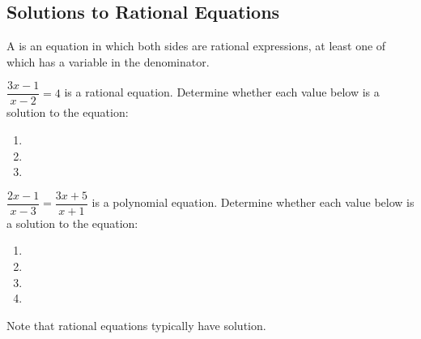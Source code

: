 \subsection{Solutions to Rational Equations} 
\begin{definition}
A  is an equation in which both sides are rational expressions, at least one of which has a variable in the denominator.
\end{definition}
\begin{Example}
$\dfrac{3x-1}{x-2}=4$ is a rational equation. Determine whether each value below is a solution to the equation:
\begin{enumerate}\setabc
\item{}
\item{}
\item{}
\end{enumerate}
\end{Example}
\begin{Example}
$\dfrac{2x-1}{x-3}=\dfrac{3x+5}{x+1}$ is a polynomial equation. Determine whether each value below is a solution to the equation:
\begin{enumerate}\setabc
\item{}
\item{}
\item{}
\item{}
\end{enumerate}
\end{Example}
\noi Note that rational equations typically have \makeblank solution.